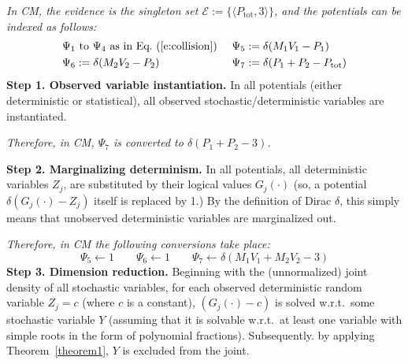 \documentclass[]{article}
\newcommand{\tuple}[1] {\langle #1 \rangle}
\newcommand{\pr}{p}
\begin{document}
\emph{In CM, the evidence is the singleton set {\footnotesize$\mathcal{E} := \{\tuple{P_\text{tot}, 3}\}$}, and 
the potentials can be indexed as follows: 
\begin{align*}\footnotesize
& \Psi_1 \text{ to } \Psi_4 \text{ as in Eq.~(\ref{e:collision}) } &&\Psi_5 := \delta(M_1V_1 - P_1)\\
&\Psi_6 := \delta(M_2V_2 - P_2)		&& \Psi_7 := \delta(P_1 + P_2 - P_\text{tot})   
\end{align*}
}
{\bf \!\!Step 1. Observed variable instantiation.} 
In all potentials (either deterministic or statistical), all observed stochastic/deterministic 
variables are instantiated. 

\emph{Therefore, in CM, 
{\footnotesize$\Psi_{7}$} is converted to 
{\footnotesize$\delta(P_1 + P_2 - 3)$}.} %

{\bf Step 2. Marginalizing determinism.}
In all potentials, all deterministic variables $Z_j$, are 
substituted by their 
logical values $G_j(\cdot)$ (so, a potential $\delta ( G_j(\cdot) - Z_j)$ itself is replaced by 1.) By the definition of Dirac $\delta$, this simply means that  unobserved deterministic variables are marginalized out.

\emph{Therefore, in CM the following conversions take place:}
\[
\Psi_5 \leftarrow 1 \qquad 
\Psi_6 \leftarrow 1
\qquad \Psi_7 \leftarrow
\delta(M_1 V_1 + M_2 V_2 - 3)
\]  
{\bf Step 3. Dimension reduction.}
Beginning with the (unnormalized) joint density of all stochastic variables,
for each observed deterministic random variable $Z_j = c$ (where $c$ is a constant),
$(G_j(\cdot) - c)$ is solved w.r.t.\ some stochastic variable 
$Y$ (assuming that it is solvable  
w.r.t.\ at least one variable with simple roots in the form of polynomial fractions).
Subsequently. by applying Theorem~\ref{theorem1}, $Y$ is excluded from the joint. %
\end{document}
